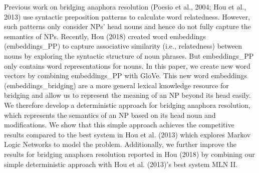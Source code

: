Previous work on bridging anaphora resolution (Poesio et al., 2004; Hou et al., 2013) use syntactic preposition patterns to calculate word relatedness. However, such patterns only consider NPs' head nouns and hence do not fully capture the semantics of NPs. Recently, Hou (2018) created word embeddings (embeddings\_PP) to capture associative similarity (i.e., relatedness) between nouns by exploring the syntactic structure of noun phrases. But embeddings\_PP only contains word representations for nouns. In this paper, we create new word vectors by combining embeddings\_PP with GloVe. This new word embeddings (embeddings\_bridging) are a more general lexical knowledge resource for bridging and allow us to represent the meaning of an NP beyond its head easily. We therefore develop a deterministic approach for bridging anaphora resolution, which represents the semantics of an NP based on its head noun and modifications. We show that this simple approach achieves the competitive results compared to the best system in Hou et al. (2013) which explores Markov Logic Networks to model the problem. Additionally, we further improve the results for bridging anaphora resolution reported in Hou (2018) by combining our simple deterministic approach with Hou et al. (2013)'s best system MLN II.

